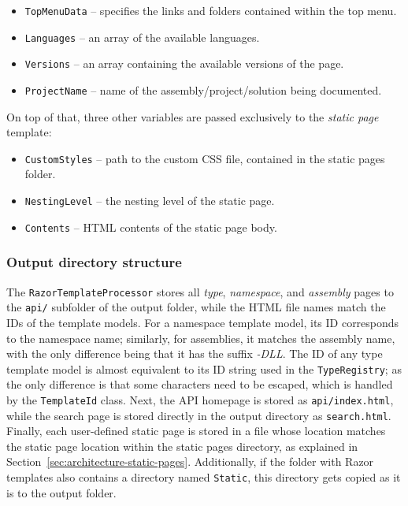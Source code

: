 \begin{itemize}
    \item \texttt{TopMenuData} -- specifies the links and folders contained within the top menu.
    \item \texttt{Languages} -- an array of the available languages.
    \item \texttt{Versions} -- an array containing the available versions of the page.
    \item \texttt{ProjectName} -- name of the assembly/project/solution being documented.
\end{itemize}

On top of that, three other variables are passed exclusively to the \textit{static page} template:
\begin{itemize}
    \item \texttt{CustomStyles} -- path to the custom CSS file, contained in the static pages folder.
    \item \texttt{NestingLevel} -- the nesting level of the static page.
    \item \texttt{Contents} -- HTML contents of the static page body.
\end{itemize}

\subsubsection{Output directory structure}
\label{sec:output-dir-structure}

The \texttt{RazorTemplateProcessor} stores all \textit{type}, \textit{namespace}, and \textit{assembly} pages to the \texttt{api/} subfolder of the output folder, while the HTML file names match the IDs of the template models.
For a namespace template model, its ID corresponds to the namespace name; similarly, for assemblies, it matches the assembly name, with the only difference being that it has the suffix \textit{-DLL}.
The ID of any type template model is almost equivalent to its ID string used in the \texttt{TypeRegistry}; as the only difference is that some characters need to be escaped, which is handled by the \texttt{TemplateId} class.
Next, the API homepage is stored as \texttt{api/index.html}, while the search page is stored directly in the output directory as \texttt{search.html}.
Finally, each user-defined static page is stored in a file whose location matches the static page location within the static pages directory, as explained in Section~\ref{sec:architecture-static-pages}.
Additionally, if the folder with Razor templates also contains a directory named \texttt{Static}, this directory gets copied as it is to the output folder.

